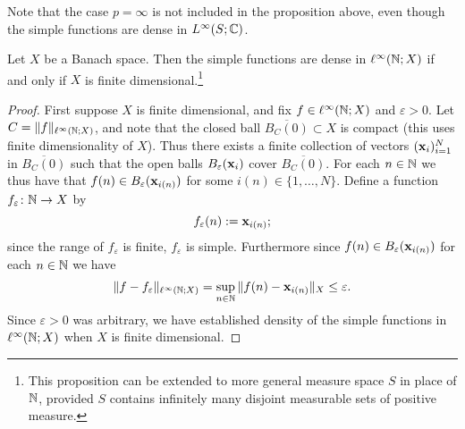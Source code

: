 Note that the case $p = \infty$ is not included in the proposition above, even though the simple functions are dense in $L^\infty(S;\mathbb{C})$.

\begin{prop}
  Let $X$ be a Banach space.
  Then the simple functions are dense in $\ell^\infty(\mathbb{N};X)$ if and only if $X$ is finite dimensional.\footnote{This proposition can be extended to more general measure space $S$ in place of $\mathbb{N}$, provided $S$ contains infinitely many disjoint measurable sets of positive measure.}
\end{prop}

\begin{proof}
  First suppose $X$ is finite dimensional, and fix $f \in \ell^\infty(\mathbb{N};X)$ and $\varepsilon > 0$.
  Let $C = \|f\|_{\ell^\infty(\mathbb{N};X)}$, and note that the closed ball $\overline{B_C(0)} \subset X$ is compact (this uses finite dimensionality of $X$).
  Thus there exists a finite collection of vectors $(\mathbf{x}_i)_{i=1}^N$ in $\overline{B_C(0)}$ such that the open balls $B_{\varepsilon}(\mathbf{x}_i)$ cover $\overline{B_C(0)}$.
  For each $n \in \mathbb{N}$ we thus have that $f(n) \in B_{\varepsilon}(\mathbf{x}_{i(n)})$ for some $i(n) \in \{1,\ldots,N\}$.
  Define a function $f_{\varepsilon} \colon \mathbb{N} \rightarrow X$ by
  \begin{equation*}
    f_{\varepsilon}(n) := \mathbf{x}_{i(n)};
  \end{equation*}
  since the range of $f_{\varepsilon}$ is finite, $f_{\varepsilon}$ is simple.
  Furthermore since $f(n) \in B_{\varepsilon}(\mathbf{x}_{i(n)})$ for each $n \in \mathbb{N}$ we have
  \begin{equation*}
    \|f - f_{\varepsilon}\|_{\ell^\infty(\mathbb{N};X)} = \sup_{n \in \mathbb{N}} \|f(n) - \mathbf{x}_{i(n)}\|_{X} \leq \varepsilon.
  \end{equation*}
  Since $\varepsilon > 0$ was arbitrary, we have established density of the simple functions in $\ell^\infty(\mathbb{N};X)$ when $X$ is finite dimensional.


\end{proof}
